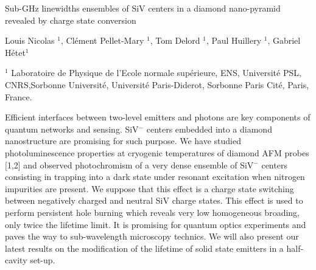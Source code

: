 \documentclass[a4paper,11pt]{article}
\begin{document}

\Large
 \begin{center}
Sub-GHz linewidths ensembles of SiV centers in a diamond nano-pyramid revealed by charge state conversion

\hspace{10pt}

\normalsize
Louis Nicolas $^1$, Cl{\'e}ment Pellet-Mary $^1$, Tom Delord $^1$, Paul Huillery $^1$, Gabriel H{\'e}tet$^1$\\

\hspace{10pt}

\small  
$^1$ Laboratoire de Physique de l'Ecole normale sup{\'e}rieure, ENS, Université PSL, CNRS,Sorbonne Universit{\'e}, Universit{\'e} Paris-Diderot, Sorbonne Paris Cit{\'e}, Paris, France.\\


\end{center}

\hspace{10pt}

\normalsize

\noindent
Efficient interfaces between two-level emitters and photons are key components of quantum networks and sensing. %
SiV$^-$ centers embedded into a diamond nanostructure are promising for such purpose. We have studied photoluminescence properties at cryogenic temperatures of diamond AFM probes [1,2] and observed photochromism of a very dense ensemble of SiV$^-$ centers consisting in trapping into a dark state under resonant excitation when nitrogen impurities are present. We suppose that this effect is a charge state switching between negatively charged and neutral SiV charge states.  This effect is used to perform persistent hole burning which reveals very low homogeneous broading, only twice the lifetime limit. It is promising  for quantum optics experiments and paves the way to sub-wavelength microscopy technics. %
We will also present our latest results on the modification of the lifetime of solid state emitters in a half-cavity set-up.

\end{document}

